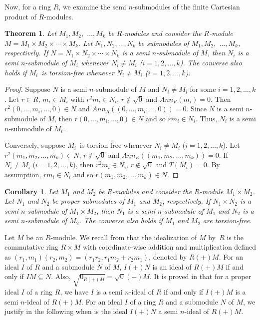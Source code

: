 \documentclass{amsart}%
\newtheorem{theorem}{Theorem}
\theoremstyle{plain}
\newtheorem{corollary}{Corollary}
\numberwithin{equation}{section}
\begin{document}
Now, for a ring $R$, we examine the semi $n$-submodules of the finite
Cartesian product of $R$-modules.

\begin{theorem}
\label{cart}Let $M_{1},M_{2},$ $\ldots,M_{k}$ be $R$-modules and consider the
$R$-module $M=M_{1}\times M_{2}\times\cdots\times M_{k}$. Let $N_{1}%
,N_{2},\ldots,N_{k}$ be submodules of $M_{1},M_{2},$ $\ldots,M_{k}$,
respectively. If $N=N_{1}\times N_{2}\times\cdots\times N_{k}$ is a semi
$n$-submodule of $M$, then $N_{i}$ is a semi $n$-submodule of $M_{i}$ whenever
$N_{i}\neq M_{i}$ ($i=1,2,\ldots,k$). The converse also holds if $M_{i}$\ is
torsion-free whenever $N_{i}\neq M_{i}$ ($i=1,2,\ldots,k$).
\end{theorem}

\begin{proof}
Suppose $N$ is a semi $n$-submodule of $M$ and $N_{i}\neq M_{i}$ for some
$i=1,2,\ldots,k$. Let $r\in R$, $m_{i}\in M_{i}$ with $r^{2}m_{i}\in N_{i}$,
$r\notin\sqrt{0}$ and $Ann_{R}(m_{i})=0.$ Then $r^{2}(0,\ldots,m_{i}%
,\ldots,0)\in N$ and $Ann_{R}((0,\ldots,m_{i},\ldots,0))=0$. Since $N$ is a
semi $n$-submodule of $M$, then $r(0,\ldots,m_{i},\ldots,0)\in N$ and so
$rm_{i}\in N_{i}$. Thus, $N_{i}$ is a semi $n$-submodule of $M_{i}.$

Conversely, suppose $M_{i}$\ is torsion-free whenever $N_{i}\neq M_{i}$
($i=1,2,\ldots,k$). Let $r^{2}(m_{1},m_{2},\ldots,m_{k})\in N$, $r\notin
\sqrt{0}$ and $Ann_{R}((m_{1},m_{2},\ldots,m_{k}))=0$. If $N_{i}\neq M_{i}$
($i=1,2,\ldots,k)$, then $r^{2}m_{i}\in N_{i}$, $r\notin\sqrt{0}$ and
$T(M_{i})=0$. By assumption, $rm_{i}\in N_{i}$ and so $r(m_{1},m_{2}%
,\ldots,m_{k})\in N$.
\end{proof}

\begin{corollary}
\label{cc}Let $M_{1}$ and $M_{2}$ be $R$-modules and consider the $R$-module
$M_{1}\times M_{2}$. Let $N_{1}$ and $N_{2}$ be proper submodules of $M_{1}$
and $M_{2}$, respectively. If $N_{1}\times N_{2}$ is a semi $n$-submodule of
$M_{1}\times M_{2}$, then $N_{1}$ is a semi $n$-submodule of $M_{1}$ and
$N_{2}$ is a semi $n$-submodule of $M_{2}$. The converse also holds if $M_{1}$
and $M_{2}$ are torsion-free.
\end{corollary}

Let $M$ be an $R$-module. We recall from \cite{Ande} that the idealization of
$M$ by~$R$ is the commutative ring $R\times M$ with coordinate-wise addition
and multiplication defined as $(r_{1},m_{1})(r_{2},m_{2})=(r_{1}r_{2}%
,r_{1}m_{2}+r_{2}m_{1})$, denoted by $R(+)M$. For an ideal $I$ of $R$ and a
submodule $N$ of $M$, $I(+)N$ is an ideal of $R(+)M$ if and only if
$IM\subseteq N$. Also, $\sqrt{0_{R(+)M}}=\sqrt{0}(+)M$. It is proved in
\cite{HE3} that for a proper ideal $I$ of a ring $R$, we have $I$ is a semi
$n$-ideal of $R$ if and only if $I(+)M$ is a semi $n$-ideal of $R(+)M$. For an
ideal $I$ of a ring $R$ and a submodule $N$ of $M$, we justify in the
following when is the ideal $I(+)N$ a semi $n$-ideal of $R(+)M$.
\end{document}
